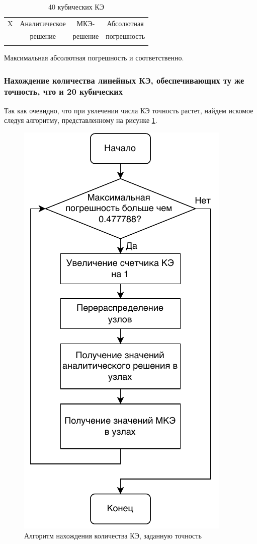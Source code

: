\begin{table}[H]
\centering
\begin{tabular}{|c|c|c|c|}
\hline
X & Аналитическое & МКЭ-    & Абсолютная \\
  & решение       & решение & погрешность \\
\hline
 \\
\hline
\end{tabular}
\caption{40 кубических КЭ}
\label{table:lin_40}
\end{table}

Максимальная абсолютная погрешность  и  соответственно.


\subsubsection{Нахождение количества линейных КЭ, обеспечивающих ту же точность, что и 20 кубических}

Так как очевидно, что при увлечении числа КЭ точность растет, найдем искомое следуя алгоритму, представленному на рисунке \ref{alg}.

\begin{figure}[H]
\centerline{\includegraphics[scale = 0.65]{labs/img/img2.pdf}}
\caption{Алгоритм нахождения количества КЭ, заданную точность}
\label{alg}
\end{figure}

